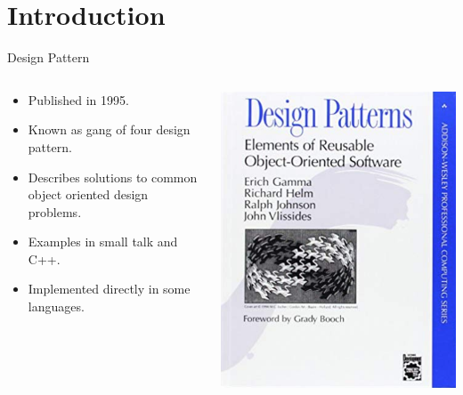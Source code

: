 \documentclass[13pt]{beamer}
\begin{document}
\section{Introduction}
\begin{frame}{Design Pattern}

\begin{columns}[T]
\begin{column}{.5\textwidth}                                          
	\begin{itemize}
		\setlength\itemsep{1em}  
		\item Published in 1995.
		\item Known as gang of four design pattern.
		\item Describes solutions to common object oriented design problems.
		\item Examples in small talk and C++.
		\item Implemented directly in some languages.
	\end{itemize}                                
\end{column}

\begin{column}{.5\textwidth}                                              
	\includegraphics[scale=0.3]{gangoffour.png}
\end{column}%
\end{columns}
\end{frame}
\end{document}
